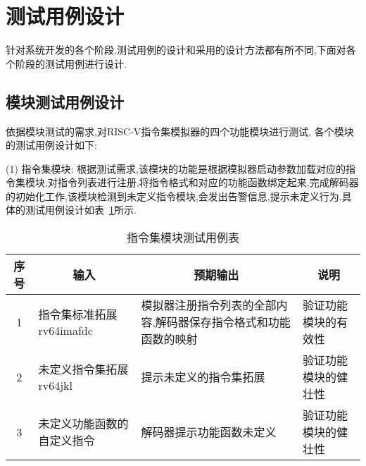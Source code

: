\section{测试用例设计}
针对系统开发的各个阶段,测试用例的设计和采用的设计方法都有所不同,下面对各个阶段的测试用例进行设计.

\subsection{模块测试用例设计}
依据模块测试的需求,对RISC-V指令集模拟器的四个功能模块进行测试, 各个模块的测试用例设计如下:


(1) 指令集模块: 根据测试需求,该模块的功能是根据模拟器启动参数加载对应的指令集模块,对指令列表进行注册,将指令格式和对应的功能函数绑定起来,完成解码器的初始化工作,该模块检测到未定义指令模块,会发出告警信息,提示未定义行为.具体的测试用例设计如表~\ref{tab:test1}所示.
\begin{table}[h]
    \centering
    \caption{指令集模块测试用例表}
    \label{tab:test1}
    \begin{tabular}{clll}
      \toprule
      \multicolumn{1}{c}{序号} & \multicolumn{1}{c}{输入} & \multicolumn{1}{c}{预期输出} &\multicolumn{1}{c}{说明}\\
      \midrule
  1	& \multicolumn{1}{m{3.5cm}}{指令集标准拓展rv64imafdc} & \multicolumn{1}{m{3.5cm}}{模拟器注册指令列表的全部内容,解码器保存指令格式和功能函数的映射} & \multicolumn{1}{m{3.5cm}}{验证功能模块的有效性}\\
  \hline
  2	& \multicolumn{1}{m{3.5cm}}{未定义指令集拓展rv64jkl} & \multicolumn{1}{m{3.5cm}}{提示未定义的指令集拓展} & \multicolumn{1}{m{3.5cm}}{验证功能模块的健壮性}\\
  \hline
  3	& \multicolumn{1}{m{3.5cm}}{未定义功能函数的自定义指令} & \multicolumn{1}{m{3.5cm}}{解码器提示功能函数未定义} & \multicolumn{1}{m{3.5cm}}{验证功能模块的健壮性}\\
      \bottomrule
    \end{tabular}
\end{table}


